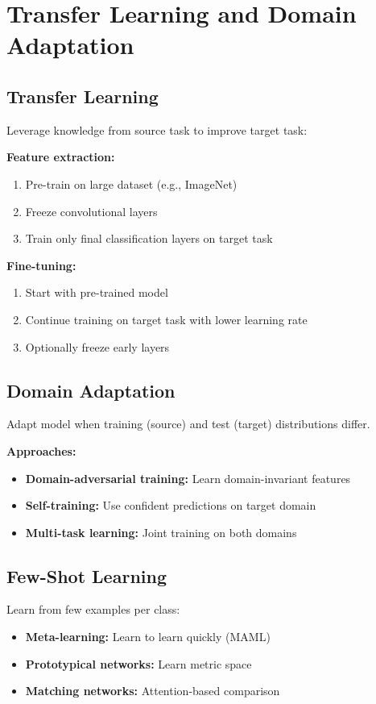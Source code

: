 
\section{Transfer Learning and Domain Adaptation}
\label{sec:transfer-learning}

\subsection{Transfer Learning}

Leverage knowledge from source task to improve target task:

\textbf{Feature extraction:}
\begin{enumerate}
    \item Pre-train on large dataset (e.g., ImageNet)
    \item Freeze convolutional layers
    \item Train only final classification layers on target task
\end{enumerate}

\textbf{Fine-tuning:}
\begin{enumerate}
    \item Start with pre-trained model
    \item Continue training on target task with lower learning rate
    \item Optionally freeze early layers
\end{enumerate}

\subsection{Domain Adaptation}

Adapt model when training (source) and test (target) distributions differ.

\textbf{Approaches:}
\begin{itemize}
    \item \textbf{Domain-adversarial training:} Learn domain-invariant features
    \item \textbf{Self-training:} Use confident predictions on target domain
    \item \textbf{Multi-task learning:} Joint training on both domains
\end{itemize}

\subsection{Few-Shot Learning}

Learn from few examples per class:
\begin{itemize}
    \item \textbf{Meta-learning:} Learn to learn quickly (MAML)
    \item \textbf{Prototypical networks:} Learn metric space
    \item \textbf{Matching networks:} Attention-based comparison
\end{itemize}

